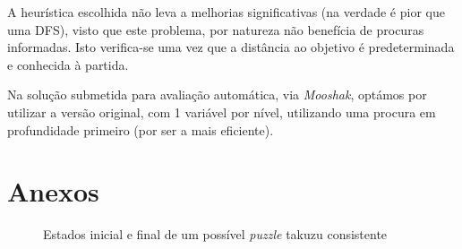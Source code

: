 \documentclass[12pt,a4paper]{article}
\begin{document}
A heurística escolhida não leva a melhorias significativas (na verdade é pior que uma DFS), visto que este problema, por natureza não benefícia de procuras informadas.
Isto verifica-se uma vez que a distância ao objetivo é predeterminada e conhecida à partida.

Na solução submetida para avaliação automática, via \textit{Mooshak}, optámos por utilizar a versão original, com 1 variável por nível, utilizando uma procura em profundidade primeiro (por ser a mais eficiente).

\section*{Anexos}

\begin{figure}[H]
  \centering
  
  \hspace*{1cm}
  
  \caption{Estados inicial e final de um possível \textit{puzzle} takuzu consistente}
  \label{fig:takuzu-initial-state}
\end{figure}
\end{document}
